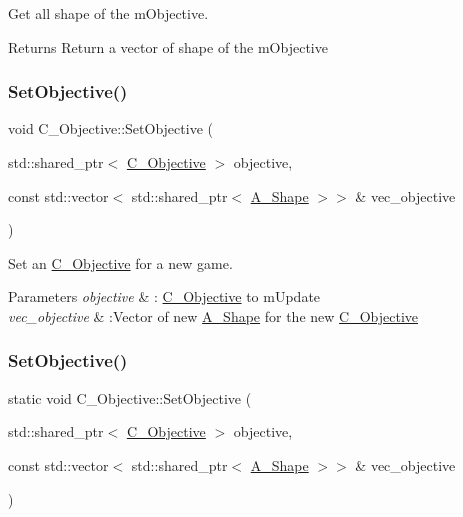 Get all shape of the m\+Objective. 

\begin{DoxyReturn}{Returns}
Return a vector of shape of the m\+Objective 
\end{DoxyReturn}
\mbox{\label{classC__Objective_a931d916840c73104815dbf529f9c866c}} 
\subsubsection{\texorpdfstring{Set\+Objective()}{SetObjective()}\hspace{0.1cm}{\footnotesize\ttfamily [1/2]}}
{\footnotesize\ttfamily void C\+\_\+\+Objective\+::\+Set\+Objective (\begin{DoxyParamCaption}\item[{std\+::shared\+\_\+ptr$<$ \hyperlink{classC__Objective}{C\+\_\+\+Objective} $>$}]{objective,  }\item[{const std\+::vector$<$ std\+::shared\+\_\+ptr$<$ \hyperlink{classA__Shape}{A\+\_\+\+Shape} $>$$>$ \&}]{vec\+\_\+objective }\end{DoxyParamCaption})\hspace{0.3cm}{\ttfamily [static]}}



Set an \hyperlink{classC__Objective}{C\+\_\+\+Objective} for a new game. 


\begin{DoxyParams}{Parameters}
{\em objective} & \+: \hyperlink{classC__Objective}{C\+\_\+\+Objective} to m\+Update \\
\hline
{\em vec\+\_\+objective} & \+:Vector of new \hyperlink{classA__Shape}{A\+\_\+\+Shape} for the new \hyperlink{classC__Objective}{C\+\_\+\+Objective} \\
\hline
\end{DoxyParams}
\mbox{\label{classC__Objective_ae571d4eb2ce6df5f317abfa0a349e8f3}} 
\subsubsection{\texorpdfstring{Set\+Objective()}{SetObjective()}\hspace{0.1cm}{\footnotesize\ttfamily [2/2]}}
{\footnotesize\ttfamily static void C\+\_\+\+Objective\+::\+Set\+Objective (\begin{DoxyParamCaption}\item[{std\+::shared\+\_\+ptr$<$ \hyperlink{classC__Objective}{C\+\_\+\+Objective} $>$}]{objective,  }\item[{const std\+::vector$<$ std\+::shared\+\_\+ptr$<$ \hyperlink{classA__Shape}{A\+\_\+\+Shape} $>$$>$ \&}]{vec\+\_\+objective }\end{DoxyParamCaption})\hspace{0.3cm}{\ttfamily [static]}}



